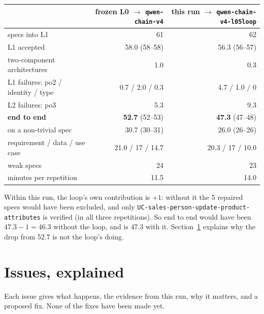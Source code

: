 \documentclass[10pt,a4paper]{article}
\newcommand{\code}[1]{\texttt{\small #1}}
\begin{document}
\begin{center}
\begin{tabular}{@{}lrr@{}}
\toprule
 & frozen L0 $\rightarrow$ \code{qwen-chain-v4} & this run $\rightarrow$ \code{qwen-chain-v4-l05loop} \\
\midrule
specs into L1                         & 61                      & 62 \\
L1 accepted                           & 58.0 (58--58)           & 56.3 (56--57) \\
\quad two-component architectures     & 1.0                     & 0.3 \\
L1 failures: po2 / identity / type    & 0.7 / 2.0 / 0.3         & 4.7 / 1.0 / 0 \\
L2 failures: po3                      & 5.3                     & 9.3 \\
\midrule
\textbf{end to end}                   & \textbf{52.7} (52--53)  & \textbf{47.3} (47--48) \\
\quad on a non-trivial spec           & 30.7 (30--31)           & 26.0 (26--26) \\
\quad requirement / data / use case   & 21.0 / 17 / 14.7        & 20.3 / 17 / 10.0 \\
weak specs                            & 24                      & 23 \\
minutes per repetition                & 11.5                    & 14.0 \\
\bottomrule
\end{tabular}
\end{center}

Within this run, the loop's own contribution is $+1$: without it the 5 repaired specs would have been excluded, and only
\code{UC-sales-person-update-product-attributes} is verified (in all three repetitions). So end to end would have been
$47.3 - 1 = 46.3$ without the loop, and is 47.3 with it. Section~\ref{sec:issues} explains why the drop from 52.7 is not
the loop's doing.

\clearpage
\section{Issues, explained}\label{sec:issues}
Each issue gives what happens, the evidence from this run, why it matters, and a proposed fix. None of the fixes have been
made yet.

\end{document}
